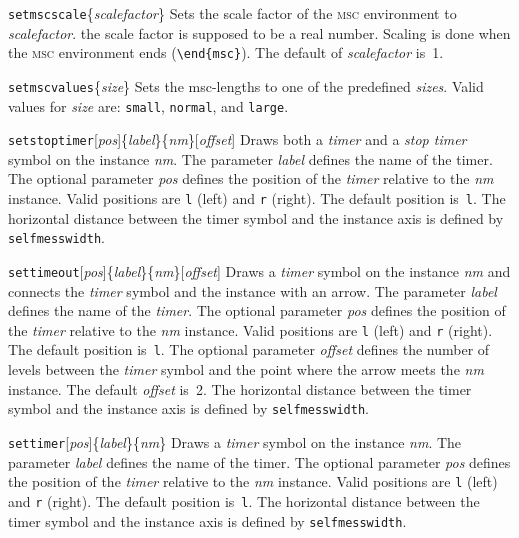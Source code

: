 \documentclass[a4paper]{article}
\newcommand{\cmd}[1]{\texttt{\bslash #1}}
\newcommand{\acro}[1]{{\scshape\lowercase{#1}}}
\newcommand\MSC{\acro{MSC}}
\newcommand{\opt}[1]{[#1]}
\newenvironment{defs}{%
  \begin{list}{}%
              {\setlength{\labelwidth}{0pt}%
               \setlength{\labelsep}{1em}%
               \setlength{\leftmargin}{1em}%
               \setlength{\parsep}{1ex}%
               \setlength{\listparindent}{0pt}%
               \setlength{\rightmargin}{0pt}%
               \renewcommand{\makelabel}[1]{##1}%
               \raggedright%
              }%
  }{%
  \end{list}}
\begin{document}
\begin{defs}
\item[\cmd{setmscscale}\{\emph{scalefactor}\}] Sets the scale factor
of the \MSC{} environment to \emph{scalefactor}. the scale factor is
supposed to be a real number. Scaling is done when the \MSC{}
environment ends (\verb|\end{msc}|). The default of \emph{scalefactor}
is~1.


\item[\cmd{setmscvalues}\{\emph{size}\}] Sets the msc-lengths to one
of the predefined \emph{sizes}. Valid values for \emph{size} are:
\verb|small|, \verb|normal|, and \verb|large|.

\item[\cmd{setstoptimer}\opt{\emph{pos}}\{\emph{label}\}\{\emph{nm}\}\opt{\emph{offset}}]
Draws both a \emph{timer} and a \emph{stop timer} symbol on the
instance \emph{nm}.  The parameter \emph{label} defines the name of
the timer. The optional parameter \emph{pos} defines the position of
the \emph{timer} relative to the \emph{nm} instance. Valid positions
are \verb|l| (left) and \verb|r| (right). The default position
is~\verb|l|. The horizontal distance between the timer symbol and the
instance axis is defined by \verb+selfmesswidth+.
 
\item[\cmd{settimeout}\opt{\emph{pos}}\{\emph{label}\}\{\emph{nm}\}\opt{\emph{offset}}]
Draws a \emph{timer} symbol on the instance \emph{nm} and connects the
\emph{timer} symbol and the instance with an arrow. The parameter
\emph{label} defines the name of the \emph{timer}. The optional
parameter \emph{pos} defines the position of the \emph{timer} relative
to the \emph{nm} instance. Valid positions are \verb|l| (left) and
\verb|r| (right). The default position is~\verb|l|. The optional
parameter \emph{offset} defines the number of levels between the
\emph{timer} symbol and the point where the arrow meets the \emph{nm}
instance.  The default \emph{offset} is~2. The horizontal distance
between the timer symbol and the instance axis is defined by
\verb+selfmesswidth+.

\item[\cmd{settimer}\opt{\emph{pos}}\{\emph{label}\}\{\emph{nm}\}]
Draws a \emph{timer} symbol on the instance \emph{nm}. The parameter
\emph{label} defines the name of the timer. The optional parameter
\emph{pos} defines the position of the \emph{timer} relative to the
\emph{nm} instance. Valid positions are \verb|l| (left) and \verb|r|
(right). The default position is~\verb|l|. The horizontal distance
between the timer symbol and the instance axis is defined by
\verb+selfmesswidth+.


\end{defs}
\end{document}
